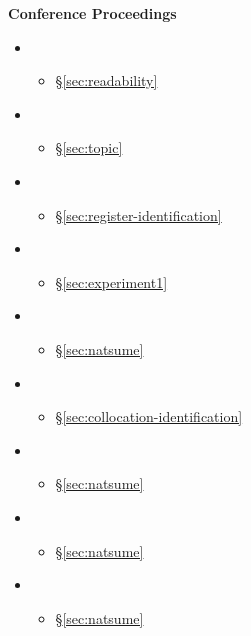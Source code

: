 \textbf{Conference Proceedings}
\begin{itemize}
  \item {}
  \begin{itemize}
    \item \S\ref{sec:readability}
  \end{itemize}
  \item {}
  \begin{itemize}
    \item \S\ref{sec:topic}
  \end{itemize}
  \item {}
  \begin{itemize}
    \item \S\ref{sec:register-identification}
  \end{itemize}
  \item {}
  \begin{itemize}
    \item \S\ref{sec:experiment1}
  \end{itemize}
  \item {}
  \begin{itemize}
    \item \S\ref{sec:natsume}
  \end{itemize}
  \item {}
  \begin{itemize}
    \item \S\ref{sec:collocation-identification}
  \end{itemize}
  \item {}
  \begin{itemize}
    \item \S\ref{sec:natsume}
  \end{itemize}
  \item {}
  \begin{itemize}
    \item \S\ref{sec:natsume}
  \end{itemize}
  \item {}
  \begin{itemize}
    \item \S\ref{sec:natsume}
  \end{itemize}
\end{itemize}

